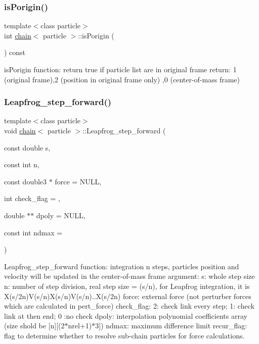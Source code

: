 \subsubsection{\texorpdfstring{is\+Porigin()}{isPorigin()}}
{\footnotesize\ttfamily template$<$class particle$>$ \\
int \hyperlink{classchain}{chain}$<$ particle $>$\+::is\+Porigin (\begin{DoxyParamCaption}{ }\end{DoxyParamCaption}) const\hspace{0.3cm}{\ttfamily [inline]}}



is\+Porigin function\+: return true if particle list are in original frame return\+: 1 (original frame),2 (position in original frame only) ,0 (center-\/of-\/mass frame) 

\hypertarget{classchain_a337be88f209915ffceb971b27f71f0be}{}\label{classchain_a337be88f209915ffceb971b27f71f0be} 
\subsubsection{\texorpdfstring{Leapfrog\+\_\+step\+\_\+forward()}{Leapfrog\_step\_forward()}}
{\footnotesize\ttfamily template$<$class particle$>$ \\
void \hyperlink{classchain}{chain}$<$ particle $>$\+::Leapfrog\+\_\+step\+\_\+forward (\begin{DoxyParamCaption}\item[{const double}]{s,  }\item[{const int}]{n,  }\item[{const double3 $\ast$}]{force = {\ttfamily NULL},  }\item[{int}]{check\+\_\+flag = {},  }\item[{double $\ast$$\ast$}]{dpoly = {\ttfamily NULL},  }\item[{const int}]{ndmax = {} }\end{DoxyParamCaption})\hspace{0.3cm}{\ttfamily [inline]}}



Leapfrog\+\_\+step\+\_\+forward function\+: integration n steps, particles\textquotesingle{} position and velocity will be updated in the center-\/of-\/mass frame argument\+: s\+: whole step size n\+: number of step division, real step size = (s/n), for Leapfrog integration, it is X(s/2n)V(s/n)X(s/n)V(s/n)..X(s/2n) force\+: external force (not perturber forces which are calculated in pert\+\_\+force) check\+\_\+flag\+: 2\+: check link every step; 1\+: check link at then end; 0 \+:no check dpoly\+: interpolation polynomial coefficients array (size shold be \mbox{[}n\mbox{]}\mbox{[}(2$\ast$nrel+1)$\ast$3\mbox{]}) ndmax\+: maximum difference limit recur\+\_\+flag\+: flag to determine whether to resolve sub-\/chain particles for force calculations. 

